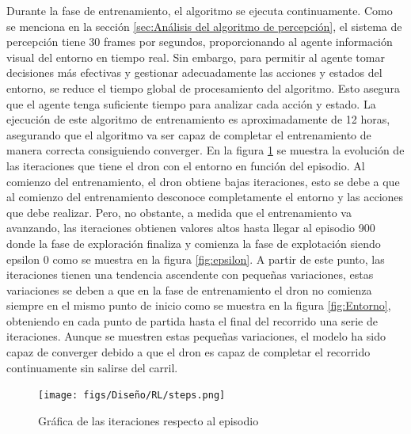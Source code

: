 Durante la fase de entrenamiento, el algoritmo se ejecuta continuamente. Como se menciona en la sección \ref{sec:Análisis del algoritmo de percepción}, el sistema de percepción tiene 30 frames por
segundos, proporcionando al agente información visual del entorno en tiempo real. Sin embargo, para permitir al agente tomar decisiones más efectivas y gestionar adecuadamente las acciones 
y estados del entorno, se reduce el tiempo global de procesamiento del algoritmo. Esto asegura que el agente tenga suficiente tiempo para analizar cada acción y estado. La ejecución de este 
algoritmo de entrenamiento es aproximadamente de 12 horas, asegurando que el algoritmo va ser capaz de completar el entrenamiento de manera correcta consiguiendo converger. En la figura \ref{fig:iteraciones} 
se muestra la evolución de las iteraciones que tiene el dron con el entorno en función del episodio. Al comienzo del entrenamiento, el dron obtiene bajas iteraciones, esto se debe a que 
al comienzo del entrenamiento desconoce completamente el entorno y las acciones que debe realizar. Pero, no obstante, a medida que el entrenamiento va avanzando, 
las iteraciones obtienen valores altos hasta llegar al episodio
900 donde la fase de exploración finaliza y comienza la fase de explotación siendo epsilon 0 como se muestra en la figura \ref{fig:epsilon}. A partir de este punto, las iteraciones tienen 
una tendencia ascendente con pequeñas variaciones, estas variaciones se deben a que en la fase de entrenamiento el dron no comienza siempre en el mismo punto de inicio como 
se muestra en la figura \ref{fig:Entorno}, obteniendo en cada punto de partida hasta el final del recorrido una serie de iteraciones. Aunque se muestren estas pequeñas variaciones, el modelo
ha sido capaz de converger debido a que el dron es capaz de completar el recorrido continuamente sin salirse del carril.

\begin{figure} [H]
  \begin{center}
    \texttt{[image: figs/Diseño/RL/steps.png]}
  \end{center}
  \caption{Gráfica de las iteraciones respecto al episodio}
  \label{fig:iteraciones}
\end{figure}

